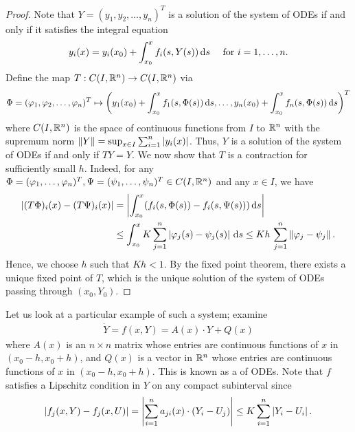 \begin{proof}
    Note that $Y = (y_{1},y_{2},\ldots,y_{n})^{T}$ is a solution of the system of ODEs if and only if it satisfies the integral equation
    \begin{align}
        y_{i}(x) = y_{i}(x_{0}) + \int_{x_{0}}^{x} f_{i}(s,Y(s)) \, \mathrm{d}s \quad \text{ for } i = 1, \ldots, n.
    \end{align}
    Define the map $T:C(I,\mathbb{R}^{n}) \to C(I,\mathbb{R}^{n})$ via
    \begin{align}
        \Phi = (\varphi_{1},\varphi_{2},\ldots,\varphi_{n})^{T} \mapsto \left( y_{1}(x_{0}) + \int_{x_{0}}^{x} f_{1}(s,\Phi(s)) \, \mathrm{d}s, \ldots, y_{n}(x_{0}) + \int_{x_{0}}^{x} f_{n}(s,\Phi(s)) \, \mathrm{d}s \right)^{T}
    \end{align}
    where $C(I,\mathbb{R}^{n})$ is the space of continuous functions from $I$ to $\mathbb{R}^{n}$ with the supremum norm $\left\lVert Y\right\rVert = \sup_{x \in I} \sum_{i=1}^{n} \left| y_{i}(x) \right|$. Thus, $Y$ is a solution of the system of ODEs if and only if $TY = Y$. We now show that $T$ is a contraction for sufficiently small $h$. Indeed, for any $\Phi = (\varphi_{1},\ldots,\varphi_{n})^{T}, \Psi = (\psi_{1},\ldots,\psi_{n})^{T} \in C(I,\mathbb{R}^{n})$ and any $x \in I$, we have
    \begin{align}
        \left| (T\Phi)_{i}(x) - (T\Psi)_{i}(x) \right| &= \left| \int_{x_{0}}^{x} (f_{i}(s,\Phi(s)) - f_{i}(s,\Psi(s))) \, \mathrm{d}s \right| \notag \\ &\leq \int_{x_{0}}^{x} K \sum_{j=1}^{n} \left| \varphi_{j}(s) - \psi_{j}(s) \right| \, \mathrm{d}s \leq K h \, \sum_{j=1}^{n} \left\lVert\varphi_{j} - \psi_{j}\right\rVert.
    \end{align}
    Hence, we choose $h$ such that $K h < 1$. By the fixed point theorem, there exists a unique fixed point of $T$, which is the unique solution of the system of ODEs passing through $(x_{0},Y_{0})$.
\end{proof}
Let us look at a particular example of such a system; examine
\begin{align}
    \dot{Y} = f(x,Y) = A(x) \cdot Y + Q(x)
\end{align}
where $A(x)$ is an $n \times n$ matrix whose entries are continuous functions of $x$ in $(x_{0}-h,x_{0}+h)$, and $Q(x)$ is a vector in $\mathbb{R}^{n}$ whose entries are continuous functions of $x$ in $(x_{0}-h,x_{0}+h)$. This is known as a  of ODEs. Note that $f$ satisfies a Lipschitz condition in $Y$ on any compact subinterval since
\begin{align}
    \left| f_{j}(x,Y) - f_{j}(x,U) \right| = \left| \sum_{i=1}^{n} a_{ji}(x) \cdot (Y_{i}-U_{j}) \right| \leq K \sum_{i=1}^{n} \left| Y_{i}-U_{i} \right|.
\end{align}
